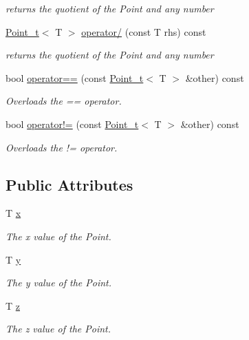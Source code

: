 \begin{DoxyCompactItemize}
\begin{DoxyCompactList}\small\item\em returns the quotient of the Point and any number \end{DoxyCompactList}\item 
\hyperlink{class_point__t}{Point\+\_\+t}$<$ T $>$ \hyperlink{class_point__t_ac7987146c54aa27b05399048598634c3}{operator/} (const T rhs) const
\begin{DoxyCompactList}\small\item\em returns the quotient of the Point and any number \end{DoxyCompactList}\item 
bool \hyperlink{class_point__t_aa9e7b08f004641102956f486c18e79b7}{operator==} (const \hyperlink{class_point__t}{Point\+\_\+t}$<$ T $>$ \&other) const
\begin{DoxyCompactList}\small\item\em Overloads the == operator. \end{DoxyCompactList}\item 
bool \hyperlink{class_point__t_aa5f770c4e0b7e3fe1e426fdebc4cd0f9}{operator!=} (const \hyperlink{class_point__t}{Point\+\_\+t}$<$ T $>$ \&other) const
\begin{DoxyCompactList}\small\item\em Overloads the != operator. \end{DoxyCompactList}\end{DoxyCompactItemize}
\subsection*{Public Attributes}
\begin{DoxyCompactItemize}
\item 
T \hyperlink{class_point__t_add0b296463fdccbde77953e480ae3d2d}{x}
\begin{DoxyCompactList}\small\item\em The x value of the Point. \end{DoxyCompactList}\item 
T \hyperlink{class_point__t_a2c1d504b00b0cf59edd07ad7611bbfde}{y}
\begin{DoxyCompactList}\small\item\em The y value of the Point. \end{DoxyCompactList}\item 
T \hyperlink{class_point__t_a7480dcfc81f5cf2eff6434da05b26c18}{z}
\begin{DoxyCompactList}\small\item\em The z value of the Point. \end{DoxyCompactList}\end{DoxyCompactItemize}


